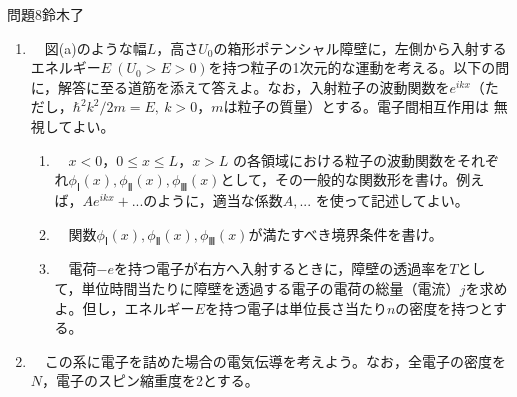 \documentclass[fleqn]{jbook}
\begin{document}

\begin{question}{問題8}{鈴木了}
\setcounter{equation}{0}


\begin{enumerate}

  \item 　図(a)のような幅$L$，高さ$U_0$の箱形ポテンシャル障壁に，左側から入射するエネルギー$E~(U_0>E>0)$を持つ粒子の1次元的な運動を考える。以下の問に，解答に至る道筋を添えて答えよ。なお，入射粒子の波動関数を$e^{i kx}$（ただし，$\hbar^2k^2/2m=E,~k>0$，$m$は粒子の質量）とする。電子間相互作用は
無視してよい。\\

\begin{figure}[hbt]
\begin{center}

\vfill
\end{center}
\end{figure}

  \begin{enumerate}
  
    \item 　$x<0$，$0\le x\le L$，$x>L$ の各領域における粒子の波動関数をそれぞれ$\phi_Ⅰ(x),\phi_Ⅱ(x),\phi_Ⅲ(x)$として，その一般的な関数形を書け。例えば，$Ae^{i kx}+ ...$のように，適当な係数$A, ...$ を使って記述してよい。\\
    
    \item 　関数$\phi_Ⅰ(x),\phi_Ⅱ(x),\phi_Ⅲ(x)$が満たすべき境界条件を書け。\\
    
    \item 　電荷$-e$を持つ電子が右方へ入射するときに，障壁の透過率を$T$として，単位時間当たりに障壁を透過する電子の電荷の総量（電流）$j$を求めよ。但し，エネルギー$E$を持つ電子は単位長さ当たり$n$の密度を持つとする。\\
    
\end{enumerate}

  \item 　この系に電子を詰めた場合の電気伝導を考えよう。なお，全電子の密度を$N$，電子のスピン縮重度を2とする。\\
  

\end{enumerate}
\end{question}
\end{document}
